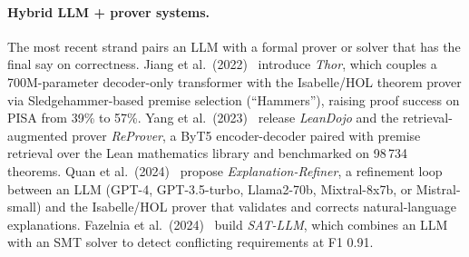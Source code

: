 \paragraph{Hybrid LLM + prover systems.}
The most recent strand pairs an LLM with a formal prover or solver that has the final say on correctness.
Jiang et al.\ (2022)~\cite{Jiang2022} introduce \emph{Thor}, which couples a 700M-parameter decoder-only transformer with the Isabelle/HOL theorem prover via Sledgehammer-based premise selection (``Hammers''), raising proof success on PISA from 39\% to 57\%.
Yang et al.\ (2023)~\cite{Yang2023} release \emph{LeanDojo} and the retrieval-augmented prover \emph{ReProver}, a ByT5 encoder-decoder paired with premise retrieval over the Lean mathematics library and benchmarked on 98\,734 theorems.
Quan et al.\ (2024)~\cite{quan2024verificationrefinementnaturallanguage} propose \emph{Explanation-Refiner}, a refinement loop between an LLM (GPT-4, GPT-3.5-turbo, Llama2-70b, Mixtral-8x7b, or Mistral-small) and the Isabelle/HOL prover that validates and corrects natural-language explanations.
Fazelnia et al.\ (2024)~\cite{10.1145/3691620.3695302} build \emph{SAT-LLM}, which combines an LLM with an SMT solver to detect conflicting requirements at F1 0.91.


